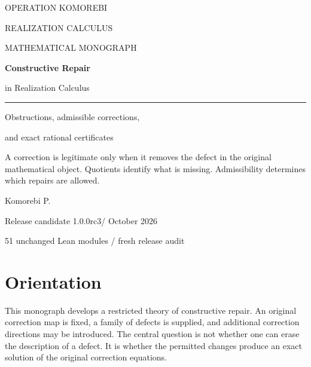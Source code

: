 \documentclass[11pt,letterpaper,oneside,openany]{book}
\theoremstyle{quiet}
\begin{document}
\begin{titlepage}
\pagecolor{WarmPaper}
\color{Ink}
{\sffamily\fontsize{11}{15}\selectfont\color{Pine}OPERATION KOMOREBI\par}
\vspace{5pt}
{\sffamily\fontsize{9}{12}\selectfont\color{Slate}REALIZATION CALCULUS\par}
\vspace{1.1in}
{\sffamily\small\color{Pine}MATHEMATICAL MONOGRAPH\par}
\vspace{17pt}
{\fontsize{37}{42}\selectfont\bfseries Constructive Repair\par}
\vspace{7pt}
{\fontsize{27}{33}\selectfont in Realization Calculus\par}
\vspace{22pt}
{\color{Ochre}\rule{1.7in}{0.8pt}\par}
\vspace{19pt}
{\fontsize{16}{22}\selectfont Obstructions, admissible corrections,\par and exact rational certificates\par}
\vspace{0.55in}
\begin{minipage}{0.86\textwidth}
\large A correction is legitimate only when it removes the defect in the original mathematical object. Quotients identify what is missing. Admissibility determines which repairs are allowed.
\end{minipage}
\vfill
{\Large Komorebi P.\par}
\vspace{17pt}
{\sffamily\small\color{Slate}Release candidate 1.0.0rc3\quad / October 2026\par}
\vspace{6pt}
{\sffamily\footnotesize\color{Slate}51 unchanged Lean modules / fresh release audit\par}
\end{titlepage}
\nopagecolor
\setcounter{page}{2}
\chapter*{Orientation}
This monograph develops a restricted theory of constructive repair. An original correction map is fixed, a family of defects is supplied, and additional correction directions may be introduced. The central question is not whether one can erase the description of a defect. It is whether the permitted changes produce an exact solution of the original correction equations.
\end{document}
